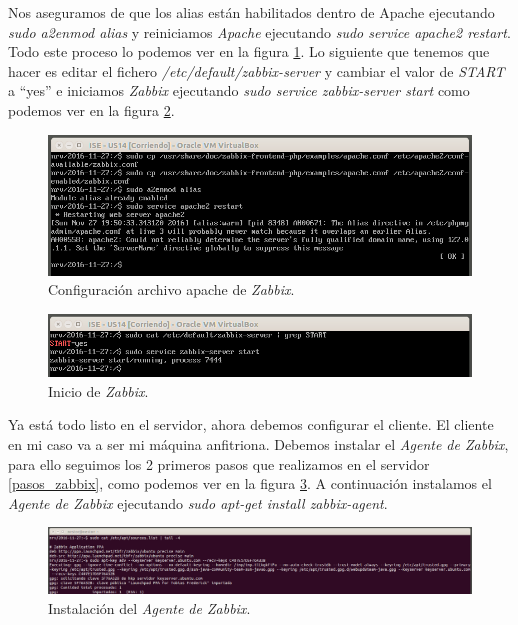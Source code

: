 \documentclass[a4paper,titlepage,12pt]{scrartcl}	%
\numberwithin{figure}{section} %
\numberwithin{table}{section} %
\begin{document}
	Nos aseguramos de que los alias están habilitados dentro de Apache ejecutando \textit{sudo a2enmod alias} y reiniciamos \textit{Apache} ejecutando \textit{sudo service apache2 restart}. Todo este proceso lo podemos ver en la figura \ref{O4-9}. Lo siguiente que tenemos que hacer es editar el fichero \textit{/etc/default/zabbix-server} y cambiar el valor de \textit{START} a ``yes'' e iniciamos \textit{Zabbix} ejecutando \textit{sudo service zabbix-server start} como podemos ver en la figura \ref{O4-10}.
	
	\begin{figure}[H]
		\includegraphics[width=\linewidth]{./Imagenes/O4-9.png}
		\vspace{-0.5cm}
		\caption[Configuración archivo apache de \textit{Zabbix}.]{Configuración archivo apache de \textit{Zabbix}.}
		\label{O4-9}
	\end{figure}
	
	\begin{figure}[H]
		\includegraphics[width=\linewidth]{./Imagenes/O4-10.png}
		\vspace{-0.5cm}
		\caption[Inicio de \textit{Zabbix}.]{Inicio de \textit{Zabbix}.}
		\label{O4-10}
	\end{figure}
	
	Ya está todo listo en el servidor, ahora debemos configurar el cliente. El cliente en mi caso va a ser mi máquina anfitriona. Debemos instalar el \textit{Agente de Zabbix}, para ello seguimos los 2 primeros pasos que realizamos en el servidor \ref{pasos_zabbix}, como podemos ver en la figura \ref{O4-11}. A continuación instalamos el \textit{Agente de Zabbix} ejecutando \textit{sudo apt-get install zabbix-agent}.
	
	\begin{figure}[H]
		\includegraphics[width=\linewidth]{./Imagenes/O4-11.png}
		\vspace{-0.5cm}
		\caption[Instalación del \textit{Agente de Zabbix}.]{Instalación del \textit{Agente de Zabbix}.}
		\label{O4-11}
	\end{figure}
	
\end{document}
